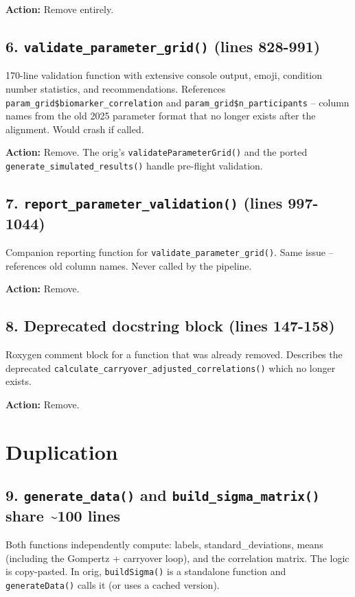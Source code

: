 \documentclass[11pt]{article}
\begin{document}
\textbf{Action:} Remove entirely.

\subsection{6. \texttt{validate\_parameter\_grid()} (lines 828-991)}

170-line validation function with extensive console output, emoji,
condition number statistics, and recommendations. References
\texttt{param\_grid\$biomarker\_correlation} and \texttt{param\_grid\$n\_participants}
-- column names from the old 2025 parameter format that no longer
exists after the alignment. Would crash if called.

\textbf{Action:} Remove. The orig's \texttt{validateParameterGrid()} and the
ported \texttt{generate\_simulated\_results()} handle pre-flight validation.

\subsection{7. \texttt{report\_parameter\_validation()} (lines 997-1044)}

Companion reporting function for \texttt{validate\_parameter\_grid()}. Same
issue -- references old column names. Never called by the pipeline.

\textbf{Action:} Remove.

\subsection{8. Deprecated docstring block (lines 147-158)}

Roxygen comment block for a function that was already removed.
Describes the deprecated \texttt{calculate\_carryover\_adjusted\_correlations()}
which no longer exists.

\textbf{Action:} Remove.

\section{Duplication}

\subsection{9. \texttt{generate\_data()} and \texttt{build\_sigma\_matrix()} share \textasciitilde{}100 lines}

Both functions independently compute: labels, standard\_deviations,
means (including the Gompertz + carryover loop), and the correlation
matrix. The logic is copy-pasted. In orig, \texttt{buildSigma()} is a
standalone function and \texttt{generateData()} calls it (or uses a
cached version).
\end{document}
